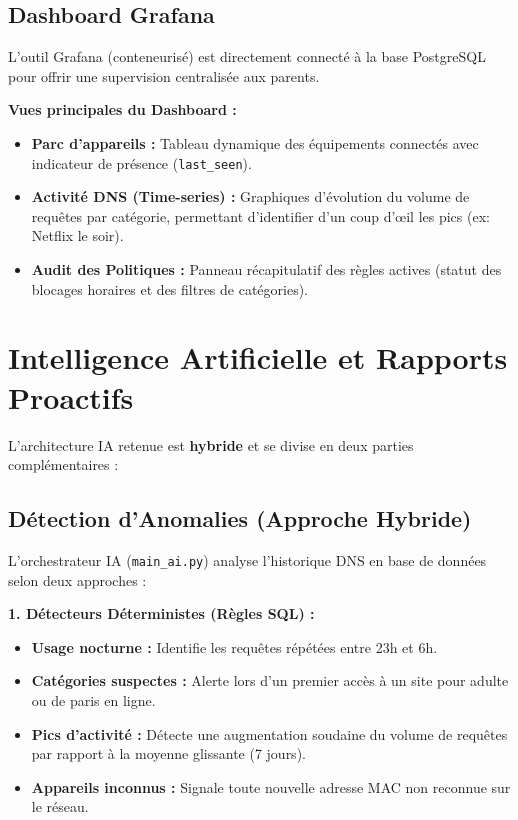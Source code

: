 \documentclass[11pt,a4paper]{article}
\begin{document}
\subsection{Dashboard Grafana}
L'outil Grafana (conteneurisé) est directement connecté à la base PostgreSQL pour offrir une supervision centralisée aux parents.

\textbf{Vues principales du Dashboard :}
\begin{itemize}
    \item \textbf{Parc d'appareils :} Tableau dynamique des équipements connectés avec indicateur de présence (\texttt{last\_seen}).
    \item \textbf{Activité DNS (Time-series) :} Graphiques d'évolution du volume de requêtes par catégorie, permettant d'identifier d'un coup d'œil les pics (ex: Netflix le soir).
    \item \textbf{Audit des Politiques :} Panneau récapitulatif des règles actives (statut des blocages horaires et des filtres de catégories).
\end{itemize}

\section{Intelligence Artificielle et Rapports Proactifs}

L'architecture IA retenue est \textbf{hybride} et se divise en deux parties complémentaires :

\subsection{Détection d'Anomalies (Approche Hybride)}
L'orchestrateur IA (\texttt{main\_ai.py}) analyse l'historique DNS en base de données selon deux approches :

\textbf{1. Détecteurs Déterministes (Règles SQL) :}
\begin{itemize}
    \item \textbf{Usage nocturne :} Identifie les requêtes répétées entre 23h et 6h.
    \item \textbf{Catégories suspectes :} Alerte lors d'un premier accès à un site pour adulte ou de paris en ligne.
    \item \textbf{Pics d'activité :} Détecte une augmentation soudaine du volume de requêtes par rapport à la moyenne glissante (7 jours).
    \item \textbf{Appareils inconnus :} Signale toute nouvelle adresse MAC non reconnue sur le réseau.
\end{itemize}
\end{document}
